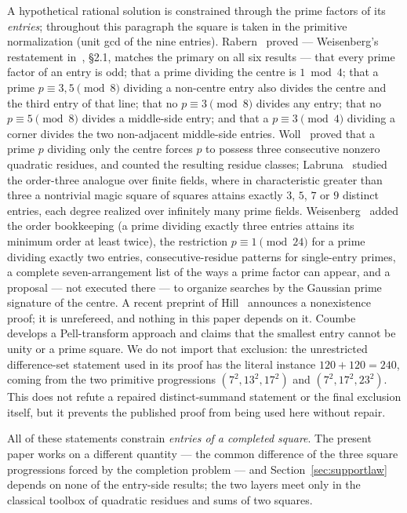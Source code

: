 A hypothetical rational solution is constrained through the prime factors of
its \emph{entries}; throughout this paragraph the square is taken in the
primitive normalization (unit gcd of the nine entries).
Rabern~\cite{RAB03} proved --- Weisenberg's restatement in~\cite{WEI23},
\S2.1, matches the primary on all six results --- that every prime factor of
an entry is odd; that a prime dividing the centre is $1 \bmod 4$; that a
prime $p\equiv3,5 \pmod 8$ dividing a non-centre entry also divides the
centre and the third entry of that line; that no $p\equiv3\pmod 8$ divides
any entry; that no $p\equiv5\pmod8$ divides a middle-side entry; and that a
$p\equiv3\pmod4$ dividing a corner divides the two non-adjacent middle-side
entries. Woll~\cite{WOL18} proved that a prime $p$ dividing only the centre
forces $p$ to possess three consecutive nonzero quadratic residues, and
counted the resulting residue classes; Labruna~\cite{LAB18} studied the
order-three analogue over finite fields, where in characteristic greater
than three a nontrivial magic square of squares attains exactly $3$, $5$,
$7$ or $9$ distinct entries, each degree realized over infinitely many
prime fields. Weisenberg~\cite{WEI23} added the
order bookkeeping (a prime dividing exactly three entries attains its
minimum order at least twice), the restriction $p\equiv1\pmod{24}$ for a
prime dividing exactly two entries, consecutive-residue patterns for
single-entry primes, a complete seven-arrangement list of the ways a prime
factor can appear, and a proposal --- not executed there --- to organize
searches by the Gaussian prime signature of the centre. A recent preprint
of Hill~\cite{HILL26} announces a nonexistence proof; it is unrefereed,
and nothing in this paper depends on it.
Coumbe~\cite{COU24} develops a Pell-transform approach and claims that the
smallest entry cannot be unity or a prime square. We do not import that
exclusion: the unrestricted difference-set statement used in its proof has
the literal instance $120+120=240$, coming from the two primitive
progressions $(7^2,13^2,17^2)$ and $(7^2,17^2,23^2)$. This does not refute
a repaired distinct-summand statement or the final exclusion itself, but it
prevents the published proof from being used here without repair.

All of these statements constrain \emph{entries of a completed square}.
The present paper works on a different quantity --- the common difference
of the three square progressions forced by the completion problem --- and
Section~\ref{sec:supportlaw} depends on none of the entry-side results;
the two layers meet only in the classical toolbox of quadratic residues
and sums of two squares.



